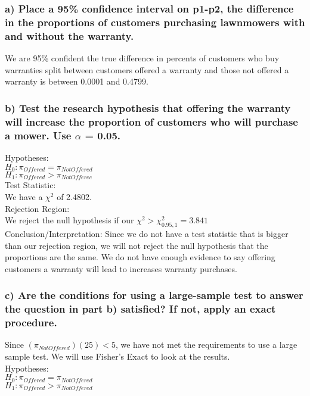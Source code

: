 \documentclass{article}
\begin{document}
\subsubsection*{a) Place a 95\% confidence interval on p1-p2, the difference in the proportions of customers purchasing lawnmowers with and without the warranty. }
We are 95\% confident the true difference in percents of customers who buy warranties split between customers offered a warranty and those not offered a warranty is between 0.0001 and 0.4799.  

\subsubsection*{b) Test the research hypothesis that offering the warranty will increase the proportion of customers who will purchase a mower.  Use $\alpha$ = 0.05.}
Hypotheses: \\
$H_{0}: \pi_{Offered} = \pi_{NotOffered}$ \\
$H_{1}: \pi_{Offered} > \pi_{NotOfferec}$ \\

Test Statistic: \\ 
We have a $\chi^{2}$ of 2.4802.   \\ 

Rejection Region: \\
We reject the null hypothesis if our $\chi^{2} > \chi_{0.95, 1}^{2} = 3.841$  \\

Conclusion/Interpretation:
Since we do not have a test statistic that is bigger than our rejection region, we will not reject the null hypothesis that the proportions are the same.  We do not have enough evidence to say offering customers a warranty will lead to increases warranty purchases.  

\subsubsection*{c) Are the conditions for using a large-sample test to answer the question in part b) satisfied?  If not, apply an exact procedure.}
Since $\left(\pi_{NotOffered}\right)(25) < 5$, we have not met the requirements to use a large sample test.  We will use Fisher's Exact to look at the results.  \\

Hypotheses: \\
$H_{0}: \pi_{Offered} = \pi_{NotOffered}$ \\
$H_{1}: \pi_{Offered} > \pi_{NotOffered}$  \\
\end{document}
